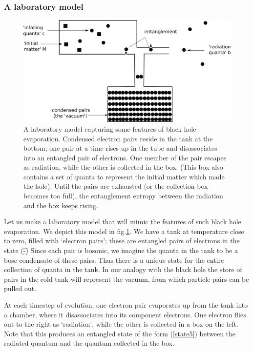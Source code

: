 \documentclass[11pt]{article}
\begin{document}
\subsubsection{A laboratory model}


\begin{figure}[htbp]
\begin{center}
\includegraphics[scale=.25]{fn3.eps}
\caption{{A laboratory model capturing some features of black hole evaporation. Condensed electron pairs reside in the tank at the bottom; one pair at a time rises up in the tube and disassociates into an entangled pair of electrons. One member of the pair escapes as radiation, while the other is collected in the box. (This box also contains a set of quanta to represent the initial matter which made the hole). Until the pairs are exhausted (or the collection box becomes too full), the entanglement entropy between the radiation and the box keeps rising.}}
\label{fn3}
\end{center}
\end{figure}


Let us make a laboratory model that will mimic the features of such black hole evaporation. We depict this model in fig.\ref{fn3}. We have a tank at temperature close to zero, filled with `electron pairs'; these are entangled pairs of electrons in the state
\be
\sq(\u\d-\d\u)
\label{state5}
\ee
Since each pair is bosonic, we imagine the quanta in the tank to be a bose condensate of these pairs. Thus there is a unique state for the entire collection of quanta in the tank. In our analogy with the black hole
the store of pairs in the cold tank will represent the vacuum, from which particle pairs can be pulled out.

At each timestep of evolution, one electron pair  evaporates up from the tank into a chamber, where it disassociates into its component electrons. One electron flies out to the right as `radiation', while the other is collected in a box on the left. Note that this produces an entangled state of the form (\ref{state5}) between the radiated quantum and the quantum collected in the box. 
\end{document}
